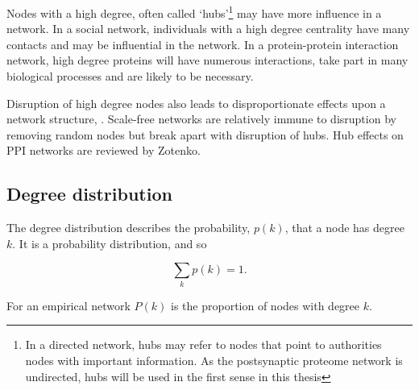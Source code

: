  Nodes with a high degree, often called `hubs'\cite{zhu2007getting}\footnote{In a directed network, hubs may refer to nodes that point to authorities nodes with important information. As the postsynaptic proteome network is undirected, hubs will be used in the first sense in this thesis\cite{kleinberg1999authoritative}} may have more influence in a network.  In a social network, individuals with a high degree centrality have many contacts and may be influential in the network. In a protein-protein interaction network, high degree proteins will have numerous interactions, take part in many biological processes and are likely to be necessary. 
 
 Disruption of high degree nodes also leads to disproportionate effects upon a network structure\cite{jeong2001lethality}, \cite{albert2000error}. Scale-free networks are relatively immune to disruption by removing random nodes but break apart with disruption of hubs. Hub effects on PPI networks are reviewed by Zotenko\cite{zotenko2008hubs}.


\subsection{Degree distribution}
\label{sec:degree distribution}
The degree distribution describes the probability, $p(k)$, that a  node has degree $k$. It is a probability distribution, and so

\begin{equation}
    \sum_k p(k)=1.
\end{equation}

For an empirical network $P(k)$ is the proportion of nodes with degree $k$. 



